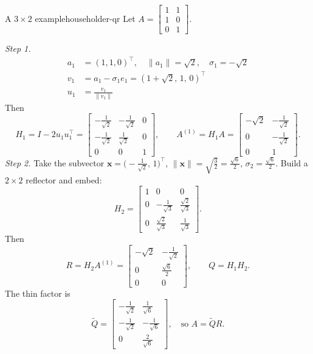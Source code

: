 \documentclass[../../main.tex]{subfiles}
\begin{document}
\begin{example}{A $3\times 2$ example}{householder-qr}
    Let $A=\begin{bmatrix}1&1\\1&0\\0&1\end{bmatrix}$.

    \emph{Step 1.}
    \begin{align*}
        a_1 & =(1,1,0)^\top, \quad \|a_1\|=\sqrt2,\quad \sigma_1=-\sqrt2 \\
        v_1 & =a_1-\sigma_1 e_1=(1+\sqrt2,\,1,\,0)^\top                  \\
        u_1 & =\frac{v_1}{\|v_1\|}
    \end{align*}
    Then
    \[
        H_1=I-2u_1u_1^\top
        =\begin{bmatrix}
            -\tfrac{1}{\sqrt2} & -\tfrac{1}{\sqrt2} & 0 \\
            -\tfrac{1}{\sqrt2} & \tfrac{1}{\sqrt2}  & 0 \\
            0                  & 0                  & 1
        \end{bmatrix},
        \qquad
        A^{(1)}=H_1A=
        \begin{bmatrix}
            -\sqrt2 & -\tfrac{1}{\sqrt2} \\
            0       & -\tfrac{1}{\sqrt2} \\
            0       & 1
        \end{bmatrix}.
    \]
    \emph{Step 2.} Take the subvector $\mathbf{x}=\bigl(-\tfrac{1}{\sqrt2},\,1\bigr)^\top$, $\|\mathbf{x}\|=\sqrt{\tfrac32}=\tfrac{\sqrt6}{2}$, $\sigma_2=\tfrac{\sqrt6}{2}$.
    Build a $2\times2$ reflector and embed:
    \[
        H_2=
        \begin{bmatrix}
            1 & 0                      & 0                      \\
            0 & -\tfrac{1}{\sqrt3}     & \tfrac{\sqrt2}{\sqrt3} \\
            0 & \tfrac{\sqrt2}{\sqrt3} & \tfrac{1}{\sqrt3}
        \end{bmatrix}.
    \]
    Then
    \[
        R=H_2A^{(1)}=
        \begin{bmatrix}
            -\sqrt2 & -\tfrac{1}{\sqrt2} \\
            0       & \tfrac{\sqrt6}{2}  \\
            0       & 0
        \end{bmatrix},
        \qquad
        Q=H_1H_2.
    \]
    The thin factor is
    \[
        \widetilde{Q}=\begin{bmatrix}
            -\tfrac{1}{\sqrt2} & \tfrac{1}{\sqrt6}  \\
            -\tfrac{1}{\sqrt2} & -\tfrac{1}{\sqrt6} \\
            0                  & \tfrac{2}{\sqrt6}
        \end{bmatrix},
        \quad
        \text{so }A=\widetilde{Q}R.
    \]
\end{example}
\end{document}
